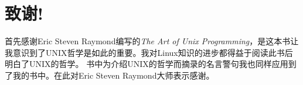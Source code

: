 \thispagestyle{empty}
\chapter*{致谢!}

首先感谢Eric Steven Raymond编写的\textit{The Art of Unix Programming}，是这本书让我意识到了UNIX哲学是如此的重要。我对Linux知识的进步都得益于阅读此书后明白了UNIX的哲学。
书中为介绍UNIX的哲学而摘录的名言警句我也同样应用到了我的书中。在此对Eric Steven Raymond大师表示感谢。

\newpage\thispagestyle{empty}